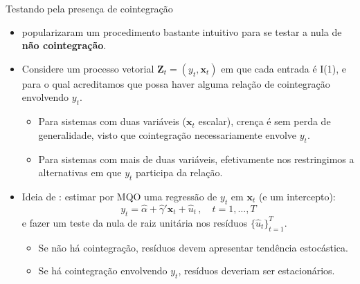 \documentclass[11pt]{beamer}
\begin{document}
\begin{frame}{Testando pela presença de cointegração}
	\begin{itemize}
		\item \citet{EngleGranger1987} popularizaram um procedimento bastante intuitivo para se testar a nula de\textbf{ não cointegração}.
		\item Considere um processo vetorial $\boldsymbol{Z}_t = (y_t, \boldsymbol{x}_t)$ em que cada entrada é I(1), e para o qual acreditamos que possa haver alguma relação de cointegração envolvendo $y_t$.\begin{itemize}
			\item Para sistemas com duas variáveis  ($\boldsymbol{x}_t$ escalar), crença é sem perda de generalidade, visto que cointegração necessariamente envolve $y_t$.
			\item Para sistemas com mais de duas variáveis, efetivamente nos restringimos a alternativas em que $y_t$ participa da relação.
		\end{itemize}
		\item Ideia de \citet{EngleGranger1987}: estimar por MQO uma regressão de $y_t$ em $\boldsymbol{x}_t$ (e um intercepto):
		$$y_t =\hat\alpha + \hat{{\gamma}}'\boldsymbol{x}_t + \hat{u}_t \, , \quad t=1,\ldots, T$$
		e fazer um teste da nula de raiz unitária nos resíduos $\{\hat u_t\}_{t=1}^T$.
		\begin{itemize}
			\item Se não há cointegração, resíduos devem apresentar tendência estocástica.
			\item Se há cointegração envolvendo $y_t$, resíduos deveriam ser estacionários.
		\end{itemize}
	\end{itemize}
\end{frame}
\end{document}
